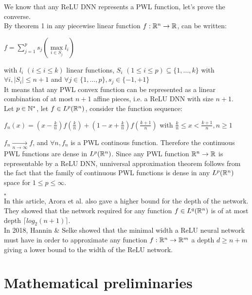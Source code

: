 \documentclass[12pt, a4paper]{article}
\newenvironment{proof}{{\sc Proof:}}{\hfill $\square$}
\begin{document}
\begin{proof}

  We know that any ReLU DNN represents a PWL function, let's prove the converse.\\
  \sv
  By theorem 1 in \cite{wang_generalization_2005} any piecewise linear function $f: \mathbb{R}^n \to \mathbb{R}$, can be written:
  \begin{center}
    $f = \sum\limits_{j=1}^{p}s_j(\max\limits_{i\in S_j} l_i)$
  \end{center}
  with $l_i$ $(i\le i \le k)$ linear functions, $S_i$ $(1 \le i \le p) \subseteq \{1, ..., k\}$ with $\forall i, |S_i| \le n + 1$ and $\forall j \in \{1,...,p\},  s_j \in \{-1, +1\}$ \\
  \sv
  It means that any PWL convex function can be represented as a linear combination of at most $n+1$ affine pieces, i.e. a ReLU DNN with size $n+1$.\\
  \SV
  Let $p \in \mathbb{N}^*$, let $f \in L^p(\mathbb{R}^n)$, consider the function sequence:
  \begin{center}
    $f_n(x) = (x - \frac{k}{n})f(\frac{k}{n}) + (1 - x + \frac{k}{n})f(\frac{k+1}{n})$ with $\frac{k}{n} \le x < \frac{k+1}{n}, n \ge 1$ 
  \end{center}

  $f_n \xrightarrow[n \to \infty]{} f$, and $\forall n, f_n$ is a PWL continous function. Therefore the continuous PWL functions are dense in $L^p(\mathbb{R}^n)$.
  \SV
  Since any PWL function $\mathbb{R}^n \to \mathbb{R}$ is representable by a ReLU DNN, unniversal approximation theorem follows from the fact that the family of continuous PWL functions is dense in any $L^p(\mathbb{R}^n)$ space for $1 \le p \le \infty$. 
  
\end{proof}\\
\SV
In this article, Arora et al. also gave a higher bound for the depth of the network. They showed that the network required for any function $f \in L^q(\mathbb{R}^n)$ is of at most depth $\lceil log_2(n+1) \rceil$.\\

In 2018, Hannin \& Selke \cite{hanin_approximating_2018} showed that the minimal width a ReLU neural network must have in order to approximate any function $f: \mathbb{R}^n \to \mathbb{R}^m$ a depth $d \ge n + m$ giving a lower bound to the width of the ReLU network.

\newpage
\thispagestyle{empty}
\mbox{}
\newpage

\section{Mathematical preliminaries}
\end{document}
